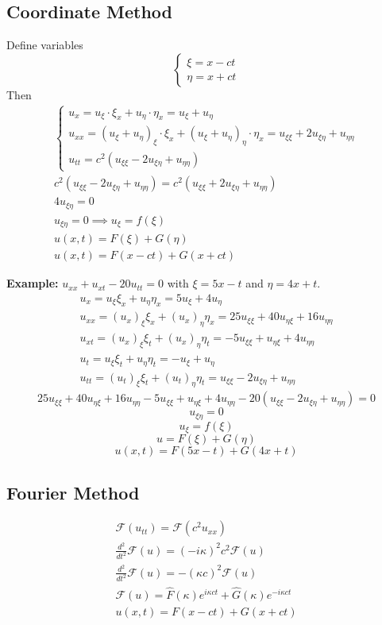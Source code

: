\documentclass[10pt]{article}
\renewcommand{\hat}[1]{\widehat{#1}}
\newcommand{\F}{\mathcal{F}}
\begin{document}
\subsection{Coordinate Method}
Define variables 
\[\begin{cases}
    \xi = x - ct\\
    \eta = x + ct
\end{cases}\]
Then 
\begin{gather*}
    \begin{cases}
        u_x = u_\xi \cdot \xi_x + u_\eta \cdot \eta_x = u_\xi + u_\eta\\
        u_{xx} = (u_\xi + u_\eta)_\xi \cdot \xi_x + (u_\xi + u_\eta)_\eta \cdot \eta_x = u_{\xi \xi} + 2u_{\xi \eta} + u_{\eta \eta}\\
        u_{tt} = c^2(u_{\xi \xi} - 2u_{\xi \eta} + u_{\eta \eta})
    \end{cases}\\
    c^2(u_{\xi \xi} - 2u_{\xi \eta} + u_{\eta \eta}) = c^2( u_{\xi \xi} + 2u_{\xi \eta} + u_{\eta \eta})\\
    4u_{\xi \eta} = 0\\
    u_{\xi \eta} = 0 \implies u_{\xi} = f(\xi)\\
    u(x, t) = F(\xi) + G(\eta)\\
    u(x, t) = F(x - ct) + G(x + ct)
\end{gather*}

\textbf{Example:} $u_{xx} + u_{xt} - 20u_{tt} = 0$ with $\xi = 5x -t$ and $\eta = 4x + t$. 
\begin{gather*}
    u_x = u_\xi \xi_x + u_\eta \eta_x = 5u_\xi + 4u_\eta\\
    u_{xx} = (u_x)_\xi \xi_x + (u_x)_\eta \eta_x = 25u_{\xi \xi} + 40u_{\eta \xi} + 16u_{\eta \eta}\\
    u_{xt} = (u_x)_\xi \xi_t + (u_x)_\eta \eta_t = -5u_{\xi \xi} + u_{\eta \xi} + 4u_{\eta \eta}\\
    u_{t} = u_\xi \xi_t + u_\eta \eta_t = -u_\xi + u_\eta\\
    u_{tt} = (u_t)_\xi \xi_t + (u_t)_\eta \eta_t = u_{\xi \xi} - 2u_{\xi \eta} + u_{\eta \eta}
\end{gather*}
\[25u_{\xi \xi} + 40u_{\eta \xi} + 16u_{\eta \eta} -5u_{\xi \xi} + u_{\eta \xi} + 4u_{\eta \eta} -20(u_{\xi \xi} - 2u_{\xi \eta} + u_{\eta \eta}) = 0\]
\[u_{\xi \eta} = 0\]
\[u_\xi = f(\xi)\]
\[u = F(\xi) + G(\eta)\]
\[u(x, t) = F(5x - t) + G(4x + t)\]

\subsection{Fourier Method}
\begin{gather*}
    \F(u_{tt}) =\F(c^2u_{xx})\\
    \frac{d^2}{dt^2}\F(u) = (-i\kappa)^2c^2 \F(u)\\
    \frac{d^2}{dt^2}\F(u) = -(\kappa c)^2 \F(u)\\
    \F(u) = \hat{F}(\kappa)e^{i\kappa ct} + \hat{G}(\kappa)e^{-i\kappa ct}\\
    u(x, t) = F(x - ct) + G(x + ct)
\end{gather*}
\end{document}
